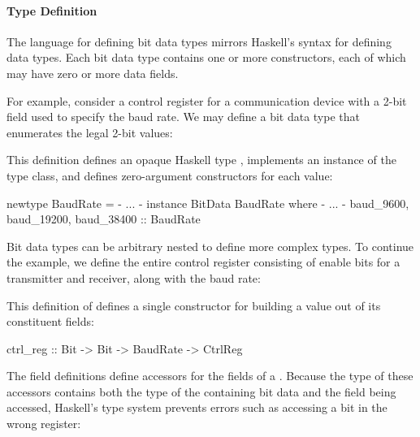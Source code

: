 \paragraph{Type Definition}
The language for defining bit data types mirrors Haskell's syntax
for defining data types. Each bit data type contains one or more
constructors, each of which may have zero or more data fields.

For example, consider a control register for a communication device
with a 2-bit field used to specify the baud rate. We may define a
bit data type  that enumerates the legal 2-bit values:

\begin{code}
[ivory|
  bitdata BaudRate :: Bits 2
    = baud_9600   as 0b00
    | baud_19200  as 0b01
    | baud_38400  as 0b10
    -- bit pattern 0b11 is invalid
|]
\end{code}

This definition defines an opaque Haskell type ,
implements an instance of the  type class, and defines
zero-argument constructors for each value:

\begin{code}
newtype BaudRate = {- ... -}
instance BitData BaudRate where
  {- ... -}
baud_9600, baud_19200, baud_38400 :: BaudRate
\end{code}

Bit data types can be arbitrary nested to define more complex types.
To continue the example, we define the entire control register consisting
of enable bits for a transmitter and receiver, along with the baud rate:

\begin{code}
[ivory|
  bitdata CtrlReg :: Bits 8 = ctrl_reg
    { ctrl_tx_enable  :: Bit
    , ctrl_rx_enable  :: Bit
    , ctrl_baud_rate  :: BaudRate
    } as 0b0000 # ctrl_tx_enable # ctrl_rx_enable
                # ctrl_baud_rate
|]
\end{code}

This definition of  defines a single constructor for building
a  value out of its constituent fields:

\begin{code}
ctrl_reg :: Bit -> Bit -> BaudRate -> CtrlReg
\end{code}

The field definitions define accessors for the fields of a
. Because the type of these accessors contains both
the type of the containing bit data and the field being accessed,
Haskell's type system prevents errors such as accessing a bit
in the wrong register:

